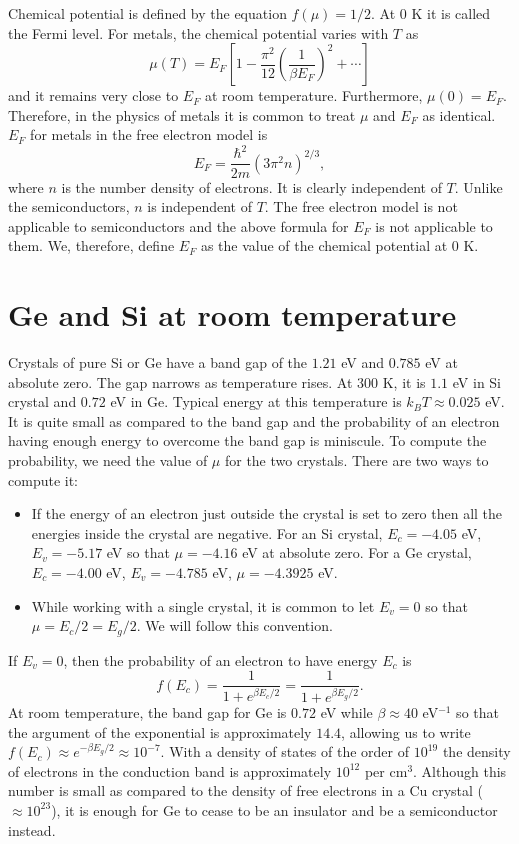 Chemical potential is defined by the equation $f(\mu) = 1/2$. At $0$ K it is 
called the Fermi level. For metals, the chemical potential varies with $T$ as
\cite{ashcroft1976solid}
\[
\mu(T) = E_F\left[1 - \frac{\pi^2}{12}\left(\frac{1}{\beta E_F}\right)^2 + 
\cdots \right]
\]
and it remains very close to $E_F$ at room temperature. Furthermore, $\mu(0) = 
E_F$. Therefore, in the physics of metals it is common to treat $\mu$ and $E_F$ 
as identical. $E_F$ for metals in the free electron model is
\[
E_F = \frac{\hbar^2}{2m}(3\pi^2n)^{2/3},
\]
where $n$ is the number density of electrons. It is clearly independent of $T$.
Unlike the semiconductors, $n$ is independent of $T$. The free electron model is
not applicable to semiconductors and the above formula for $E_F$ is not 
applicable to them. We, therefore, define $E_F$ as the value of the chemical
potential at $0$ K.

\section{Ge and Si at room temperature}\label{c1s2}
Crystals of pure Si or Ge have a band gap of the $1.21$ eV and $0.785$ eV at
absolute zero. The gap narrows as temperature rises. At $300$ K, it is $1.1$ eV
in Si crystal and $0.72$ eV in Ge. Typical energy at this temperature is $k_BT
\approx 0.025$ eV. It is quite small as compared to the band gap and the 
probability of an electron having enough energy to overcome the band gap is
miniscule. To compute the probability, we need the value of $\mu$ for the two
crystals. There are two ways to compute it:
\begin{itemize}
\item If the energy of an electron just outside the crystal is set to zero 
then all the energies inside the crystal are negative. For an Si crystal,
$E_c = -4.05$ eV, $E_v = -5.17$ eV so that $\mu = -4.16$ eV at absolute zero.
For a Ge crystal, $E_c = -4.00$ eV, $E_v = -4.785$ eV, $\mu = -4.3925$ eV.
\item While working with a single crystal, it is common to let $E_v = 0$ so
that $\mu = E_c/2 = E_g/2$. We will follow this convention.
\end{itemize}

If $E_v = 0$, then the probability of an electron to have energy $E_c$ is
\[
f(E_c) = \frac{1}{1 + e^{\beta E_c/2}} = \frac{1}{1 + e^{\beta E_g/2}}.
\]
At room temperature, the band gap for Ge is $0.72$ eV while $\beta \approx 40$
eV$^{-1}$ so that the argument of the exponential is approximately $14.4$, 
allowing us to write $f(E_c) \approx e^{-\beta E_g/2} \approx 10^{-7}$. With a 
density of states of the order of $10^{19}$ the density of electrons in the 
conduction band is approximately $10^{12}$ per cm$^3$. Although this number is 
small as compared to the density of free electrons in a Cu crystal 
($\approx 10^{23}$), it is enough for Ge to cease to be an insulator and be a 
semiconductor instead.


